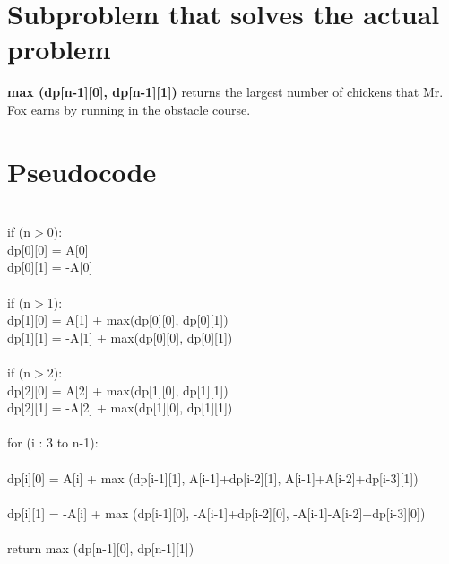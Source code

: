 \documentclass{article}
\begin{document}
\section{Subproblem that solves the actual problem}
\textbf{max (dp[n-1][0], dp[n-1][1])} \textrightarrow \hspace{1pt} returns the largest number of chickens that Mr. Fox earns by running in the obstacle course.


\section{Pseudocode}
\begin{algorithm}
\begin{algorithmic}[1]
    \\
        \hspace{20pt}if (n$>$0):\\
        \hspace{40pt}dp[0][0] = A[0]\\
        \hspace{40pt}dp[0][1] = -A[0]\\
        \\
        \hspace{20pt}if (n$>$1):\\
        \hspace{40pt}dp[1][0] = A[1] + max(dp[0][0], dp[0][1])\\
        \hspace{40pt}dp[1][1] = -A[1] + max(dp[0][0], dp[0][1])\\
        \\
        \hspace{20pt}if (n$>$2):\\
        \hspace{40pt}dp[2][0] = A[2] + max(dp[1][0], dp[1][1])\\
        \hspace{40pt}dp[2][1] = -A[2] + max(dp[1][0], dp[1][1])\\
        \\
        \hspace{20pt}for (i : 3 to n-1):\\
        \\
        \hspace{40pt}dp[i][0] = A[i] + max (dp[i-1][1], A[i-1]+dp[i-2][1], A[i-1]+A[i-2]+dp[i-3][1])\\
        \\
        \hspace{40pt}dp[i][1] = -A[i] + max (dp[i-1][0], -A[i-1]+dp[i-2][0], -A[i-1]-A[i-2]+dp[i-3][0])\\
        \\
        \hspace{20pt}return max (dp[n-1][0], dp[n-1][1])
    \EndFunction
\end{algorithmic}
\end{algorithm}
\end{document}
